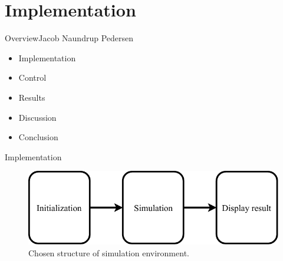 \section{Implementation}

\begin{frame}{Overview}{Jacob Naundrup Pedersen}
\begin{itemize}
	
\item Implementation
\item Control
\item Results
\item Discussion
\item Conclusion
\end{itemize}
\end{frame}

\begin{frame}{Implementation}{}

\begin{figure}[H]
\centering
\includegraphics[width=0.75 \textwidth]{figures/Basic_implementation}
\caption{Chosen structure of simulation environment.}
\label{fig:Basic_implementation}
\end{figure}


\end{frame}

